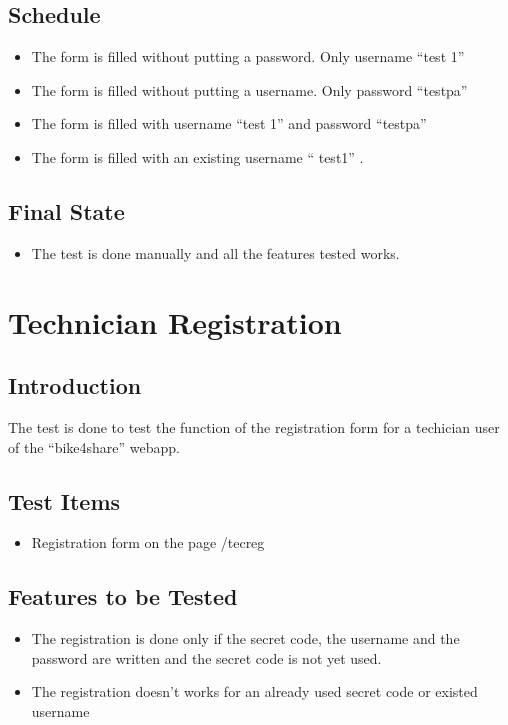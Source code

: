 \documentclass{article}
\begin{document}
\subsection{Schedule}
\begin{itemize}
    \item The form is filled without putting a password. Only username “test 1”
    \item The form is filled without putting a username. Only password “testpa”
    \item The form is filled with username “test 1” and password “testpa”
    \item The form is filled with an existing username “ test1” .
\end{itemize}
\subsection{Final State}
\begin{itemize}
    \item The test is done manually and all the features tested works.
\end{itemize}


\section{Technician Registration}
\subsection{Introduction}
The test is done to test the function of the registration form for a techician user of the “bike4share” webapp.
\subsection{Test Items}
\begin{itemize}
    \item Registration form on the page /tec\textunderscore reg
\end{itemize}
\subsection{Features to be Tested}
\begin{itemize}
    \item The registration is done only if the secret code, the username and the password are written and the secret code is not yet used.
    \item The registration doesn’t works for an already used secret code or existed username
\end{itemize}
\end{document}
